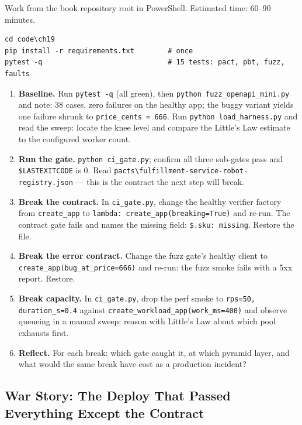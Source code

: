 Work from the book repository root in PowerShell. Estimated time: 60--90
minutes.

\begin{verbatim}
cd code\ch19
pip install -r requirements.txt        # once
pytest -q                              # 15 tests: pact, pbt, fuzz, faults
\end{verbatim}

\begin{enumerate}
  \item \textbf{Baseline.} Run \texttt{pytest -q} (all green), then
        \texttt{python fuzz\_openapi\_mini.py} and note: 38 cases, zero
        failures on the healthy app; the buggy variant yields one failure
        shrunk to \texttt{price\_cents = 666}. Run
        \texttt{python load\_harness.py} and read the sweep: locate the
        knee level and compare the Little's Law estimate to the configured
        worker count.
  \item \textbf{Run the gate.} \texttt{python ci\_gate.py}; confirm all
        three sub-gates pass and \texttt{\$LASTEXITCODE} is 0. Read
        \texttt{pacts\textbackslash{}fulfillment-service-robot-registry.json}
        --- this is the contract the next step will break.
  \item \textbf{Break the contract.} In \texttt{ci\_gate.py}, change the
        healthy verifier factory from \texttt{create\_app} to
        \texttt{lambda: create\_app(breaking=True)} and re-run. The
        contract gate fails and names the missing field:
        \texttt{\$.sku: missing}. Restore the file.
  \item \textbf{Break the error contract.} Change the fuzz gate's healthy
        client to \texttt{create\_app(bug\_at\_price=666)} and re-run: the
        fuzz smoke fails with a 5xx report. Restore.
  \item \textbf{Break capacity.} In \texttt{ci\_gate.py}, drop the perf
        smoke to \texttt{rps=50, duration\_s=0.4} against
        \texttt{create\_workload\_app(work\_ms=400)} and observe queueing
        in a manual sweep; reason with Little's Law about which pool
        exhausts first.
  \item \textbf{Reflect.} For each break: which gate caught it, at which
        pyramid layer, and what would the same break have cost as a
        production incident?
\end{enumerate}

\subsection{War Story: The Deploy That Passed Everything Except the Contract}
\label{sec:ch19-warstory}

